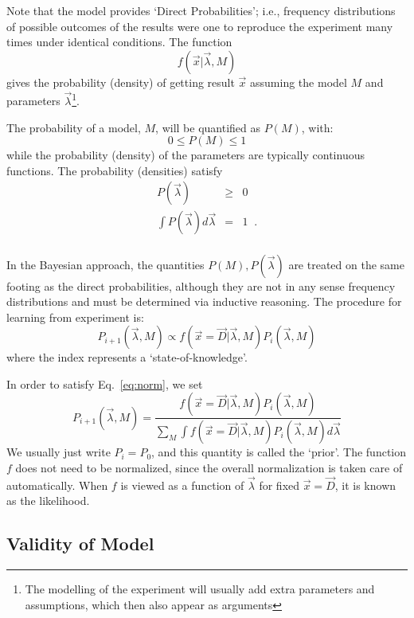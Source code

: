 \documentclass[11pt, a4paper]{article}
\begin{document}
Note that the model provides `Direct Probabilities'; i.e., frequency
distributions of possible outcomes of the results were one to
reproduce the experiment many times under identical conditions.  The
function
%
\begin{equation}
f(\vec{x}|\vec{\lambda},M)
\end{equation}
%
gives the probability (density) of getting result $\vec{x}$ assuming
the model $M$ and parameters $\vec{\lambda}$\footnote{The modelling of
the experiment will usually add extra parameters and assumptions,
which then also appear as arguments}.

The probability of a model, $M$, will be quantified as $P(M)$, with:
%
\begin{equation}
\label{eq:norm}
0 \leq P(M) \leq 1
\end{equation}
%
while the probability (density) of the parameters are typically
continuous functions.  The probability (densities) satisfy
%
\begin{eqnarray*}
P(\vec{\lambda}) & \ge & 0 \\
\int P(\vec{\lambda}) d\vec{\lambda} &=&1 \;\; .\\
\end{eqnarray*}

In the Bayesian approach, the quantities $P(M), P(\vec{\lambda})$ are
treated on the same footing as the direct probabilities, although they
are not in any sense frequency distributions and must be determined
via inductive reasoning.  The procedure for learning from experiment
is:
%
\begin{equation}
P_{i+1}(\vec{\lambda},M) \propto f(\vec{x}=\vec{D}|\vec{\lambda},M) P_{i}(\vec{\lambda},M) 
\end{equation}
%
where the index represents a `state-of-knowledge'.  

In order to satisfy Eq.~\ref{eq:norm}, we set
%
\begin{equation}
P_{i+1}(\vec{\lambda},M) =\frac{f(\vec{x}=\vec{D}|\vec{\lambda},M) P_{i}(\vec{\lambda},M)}
{\sum_M \int f(\vec{x}=\vec{D}|\vec{\lambda},M) P_{i}(\vec{\lambda},M) d{\vec{\lambda}}}
\end{equation}
%
We usually just write $P_i=P_0$, and this quantity is called the
`prior'.  The function $f$ does not need to be normalized, since the
overall normalization is taken care of automatically.  When $f$ is
viewed as a function of $\vec{\lambda}$ for fixed $\vec{x}=\vec{D}$,
it is known as the likelihood.

\subsection{Validity of Model}
\label{subsection:validity}
\end{document}
